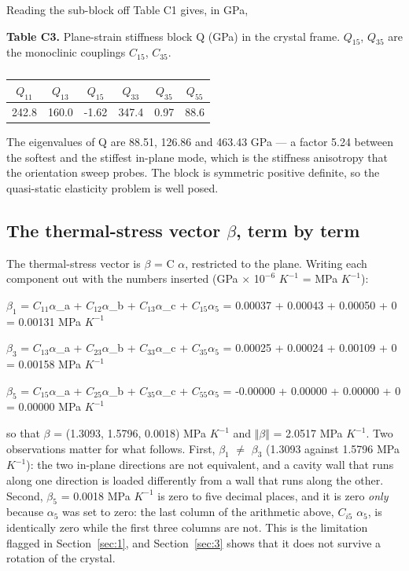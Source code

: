 \documentclass[preprint,12pt]{elsarticle}
\begin{document}
Reading the sub-block off Table C1 gives, in GPa,

\textbf{Table C3.} Plane-strain stiffness block Q (GPa) in the crystal frame. $Q_{15}$, $Q_{35}$ are the monoclinic couplings $C_{15}$, $C_{35}$.

\begin{table}[htbp]
\centering
\caption{}
\label{tab:?}
\begin{tabular}{cccccc}
\toprule
$Q_{11}$ & $Q_{13}$ & $Q_{15}$ & $Q_{33}$ & $Q_{35}$ & $Q_{55}$ \\
\midrule
242.8 & 160.0 & -1.62 & 347.4 & 0.97 & 88.6 \\
\bottomrule
\end{tabular}
\end{table}

The eigenvalues of Q are 88.51, 126.86 and 463.43 GPa --- a factor 5.24 between the softest and the stiffest in-plane mode, which is the stiffness anisotropy that the orientation sweep probes. The block is symmetric positive definite, so the quasi-static elasticity problem is well posed.

\subsection{The thermal-stress vector $\beta$, term by term}
\label{sec:2.3}

The thermal-stress vector is $\beta$ = C $\alpha$, restricted to the plane. Writing each component out with the numbers inserted (GPa $\times$ 1$0^{-6}$ $K^{-1}$ = MPa $K^{-1}$):

$\beta_{1}$ = $C_{11}\alpha$\_a + $C_{12}\alpha$\_b + $C_{13}\alpha$\_c + $C_{15}\alpha_{5}$ = 0.00037 + 0.00043 + 0.00050 + 0 = 0.00131 MPa $K^{-1}$

$\beta_{3}$ = $C_{13}\alpha$\_a + $C_{23}\alpha$\_b + $C_{33}\alpha$\_c + $C_{35}\alpha_{5}$ = 0.00025 + 0.00024 + 0.00109 + 0 = 0.00158 MPa $K^{-1}$

$\beta_{5}$ = $C_{15}\alpha$\_a + $C_{25}\alpha$\_b + $C_{35}\alpha$\_c + $C_{55}\alpha_{5}$ = -0.00000 + 0.00000 + 0.00000 + 0 = 0.00000 MPa $K^{-1}$

so that $\beta$ = (1.3093, 1.5796, 0.0018) MPa $K^{-1}$ and $\Vert \beta \Vert$ = 2.0517 MPa $K^{-1}$. Two observations matter for what follows. First, $\beta_{1}$ $\neq$ $\beta_{3}$ (1.3093 against 1.5796 MPa $K^{-1}$): the two in-plane directions are not equivalent, and a cavity wall that runs along one direction is loaded differently from a wall that runs along the other. Second, $\beta_{5}$ = 0.0018 MPa $K^{-1}$ is zero to five decimal places, and it is zero \emph{only} because $\alpha_{5}$ was set to zero: the last column of the arithmetic above, $C_{i5}$ $\alpha_{5}$, is identically zero while the first three columns are not. This is the limitation flagged in Section~\ref{sec:1}, and Section~\ref{sec:3} shows that it does not survive a rotation of the crystal.
\end{document}
